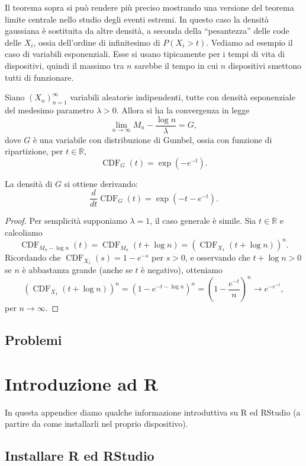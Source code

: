 \documentclass[
  italian,
  letterpaper,
]{book}
\newcommand{\bra}[1]{\left( #1 \right)}
\newcommand{\R}{\mathbb{R}}
\newcommand{\CDF}{\operatorname{CDF}}
\theoremstyle{definition}
\theoremstyle{remark}
\begin{document}
Il teorema sopra si può rendere più preciso mostrando una versione del
teorema limite centrale nello studio degli eventi estremi. In questo
caso la densità gaussiana è sostituita da altre densità, a seconda della
``pesantezza'' delle code delle \(X_i\), ossia dell'ordine di
infinitesimo di \(P(X_i >t)\). Vediamo ad esempio il caso di variabili
esponenziali. Esse si usano tipicamente per i tempi di vita di
dispositivi, quindi il massimo tra \(n\) sarebbe il tempo in cui \(n\)
dispositivi smettono tutti di funzionare.

Siano \((X_n)_{n=1}^\infty\) variabili aleatorie indipendenti, tutte con
densità esponenziale del medesimo parametro \(\lambda>0\). Allora si ha
la convergenza in legge
\[ \lim_{n \to \infty} M_n - \frac{ \log n}{\lambda} = G,\] dove \(G\) è
una variabile con distribuzione di Gumbel, ossia con funzione di
ripartizione, per \(t \in \R\), \[ \CDF_G(t) = \exp\bra{ - e^{-t}}.\]

La densità di \(G\) si ottiene derivando:
\[ \frac{d}{dt} \CDF_G(t) = \exp\bra{-t-e^{-t}  }.\]

\begin{proof}
Per semplicità supponiamo \(\lambda=1\), il caso generale è simile. Sia
\(t \in \R\) e calcoliamo
\[\CDF_{M_n - \log n}(t) =\CDF_{M_n}(t+\log n) = \bra{ \CDF_{X_1}(t+\log n)}^n.\]
Ricordando che \(\CDF_{X_1}(s) = 1-e^{-s}\) per \(s>0\), e osservando
che \(t+\log n> 0\) se \(n\) è abbastanza grande (anche se \(t\) è
negativo), otteniamo
\[ \bra{ \CDF_{X_1}(t+\log n)}^n = (1- e^{-t-\log n})^n = \bra{ 1 - \frac{e^{-t}}{n}}^n \to e^{-e^{-t}},\]
per \(n \to \infty\).
\end{proof}

\section{Problemi}\label{problemi-5}


\chapter{Introduzione ad R}\label{sec-appR}

In questa appendice diamo qualche informazione introduttiva su R ed
RStudio (a partire da come installarli nel proprio dispositivo).

\section{Installare R ed RStudio}\label{installare-r-ed-rstudio}
\end{document}
